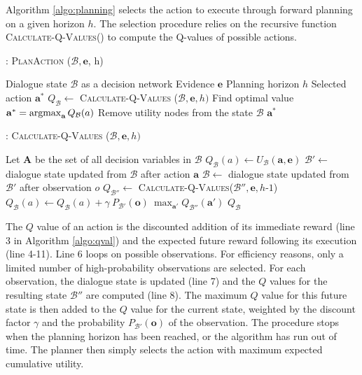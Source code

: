 Algorithm \ref{algo:planning} selects the action to execute through forward planning on a given horizon $h$.  The selection procedure relies on the recursive function \textsc{Calculate-Q-Values}() to compute the Q-values of possible actions. 

\begin{algorithm}[h!]
\caption{: \textsc{PlanAction} ($\mathcal{B}, \mathbf{e}$, h) }
\begin{algorithmic}[1] \vspace{1mm}
\REQUIRE Dialogue state $\mathcal{B}$ as a decision network
\REQUIRE Evidence $\mathbf{e}$
\REQUIRE Planning horizon $h$
\ENSURE Selected action $\mathbf{a}^*$
\STATE $Q_{\mathcal{B}} \leftarrow $ \textsc{Calculate-Q-Values} ($\mathcal{B}, \mathbf{e}, h)$
\STATE Find optimal value $\mathbf{a}^* = \argmax_{\mathbf{a}} Q_{\mathcal{B}}(a)$
\STATE Remove utility nodes from the state $\mathcal{B}$
\RETURN $\mathbf{a}^*$
\end{algorithmic}
\label{algo:planning}
\end{algorithm}


\begin{algorithm}[h!]
\caption{: \textsc{Calculate-Q-Values} ($\mathcal{B}, \mathbf{e}, h)$}
\begin{algorithmic}[1] \vspace{1mm}
\STATE Let $\mathbf{A}$ be the set of all decision variables in $\mathcal{B}$
\STATE $Q_{\mathcal{B}}(a) \leftarrow U_{\mathcal{B}}(\mathbf{a}, \mathbf{e})$
\STATE $\mathcal{B}' \leftarrow $ dialogue state updated from $\mathcal{B}$ after action $\mathbf{a}$
\STATE $\mathcal{B} \leftarrow $ dialogue state updated from $\mathcal{B}'$ after observation $o$
\STATE $Q_{\mathcal{B}''} \leftarrow $ \textsc{Calculate-Q-Values}($\mathcal{B}'', \mathbf{e}, h\mbox{-}1$)
\STATE $Q_{\mathcal{B}}(a) \leftarrow Q_{\mathcal{B}}(a) + \gamma \ P_{\mathcal{B}'}(\mathbf{o}) \ \max_{\mathbf{a}'} Q_{\mathcal{B}''}(\mathbf{a}')$
\ENDFOR
\ENDIF
\ENDFOR
\RETURN $Q_{\mathcal{B}}$
\end{algorithmic} 
\label{algo:qval}
\end{algorithm}

The $Q$ value of an action is the discounted addition of its immediate reward (line 3 in Algorithm \ref{algo:qval}) and the expected future reward following its execution (line 4-11).  Line 6 loops on possible observations.  For efficiency reasons, only a limited number of high-probability observations are selected. For each observation, the dialogue state is updated (line 7) and the $Q$ values for the resulting state $\mathcal{B}''$ are computed (line 8).  The maximum $Q$ value for this future state is then added to the $Q$ value for the current state, weighted by the discount factor $\gamma$ and the probability $P_{\mathcal{B}'} (\mathbf{o})$ of the observation.  The procedure stops when the planning horizon has been reached, or the algorithm has run out of time. The planner then simply selects the action with maximum expected cumulative utility. 

